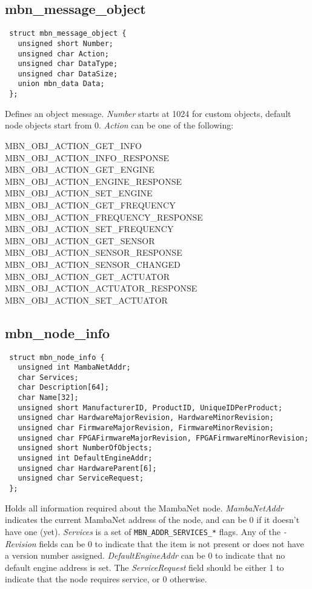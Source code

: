 \documentclass[a4paper]{report}
\begin{document}
\subsection{mbn\_message\_object}
\begin{verbatim}
 struct mbn_message_object {
   unsigned short Number;
   unsigned char Action;
   unsigned char DataType;
   unsigned char DataSize;
   union mbn_data Data;
 };
\end{verbatim}
Defines an object message. \textit{Number} starts at 1024 for custom objects, default node objects start from 0. \textit{Action} can be one of the following:
\begin{description}
 \item[MBN\_OBJ\_ACTION\_GET\_INFO]
 \item[MBN\_OBJ\_ACTION\_INFO\_RESPONSE]
 \item[MBN\_OBJ\_ACTION\_GET\_ENGINE]
 \item[MBN\_OBJ\_ACTION\_ENGINE\_RESPONSE]
 \item[MBN\_OBJ\_ACTION\_SET\_ENGINE]
 \item[MBN\_OBJ\_ACTION\_GET\_FREQUENCY]
 \item[MBN\_OBJ\_ACTION\_FREQUENCY\_RESPONSE]
 \item[MBN\_OBJ\_ACTION\_SET\_FREQUENCY]
 \item[MBN\_OBJ\_ACTION\_GET\_SENSOR]
 \item[MBN\_OBJ\_ACTION\_SENSOR\_RESPONSE]
 \item[MBN\_OBJ\_ACTION\_SENSOR\_CHANGED]
 \item[MBN\_OBJ\_ACTION\_GET\_ACTUATOR]
 \item[MBN\_OBJ\_ACTION\_ACTUATOR\_RESPONSE]
 \item[MBN\_OBJ\_ACTION\_SET\_ACTUATOR]
\end{description}


\subsection{mbn\_node\_info}
\begin{verbatim}
 struct mbn_node_info {
   unsigned int MambaNetAddr;
   char Services;
   char Description[64];
   char Name[32];
   unsigned short ManufacturerID, ProductID, UniqueIDPerProduct;
   unsigned char HardwareMajorRevision, HardwareMinorRevision;
   unsigned char FirmwareMajorRevision, FirmwareMinorRevision;
   unsigned char FPGAFirmwareMajorRevision, FPGAFirmwareMinorRevision;
   unsigned short NumberOfObjects;
   unsigned int DefaultEngineAddr;
   unsigned char HardwareParent[6];
   unsigned char ServiceRequest;
 };
\end{verbatim}
Holds all information required about the MambaNet node. \textit{MambaNetAddr} indicates the current MambaNet address of the node, and can be 0 if it doesn't have one (yet). \textit{Services} is a set of \verb|MBN_ADDR_SERVICES_*| flags. Any of the \textit{-Revision} fields can be 0 to indicate that the item is not present or does not have a version number assigned. \textit{DefaultEngineAddr} can be 0 to indicate that no default engine address is set. The \textit{ServiceRequest} field should be either 1 to indicate that the node requires service, or 0 otherwise.
\end{document}
